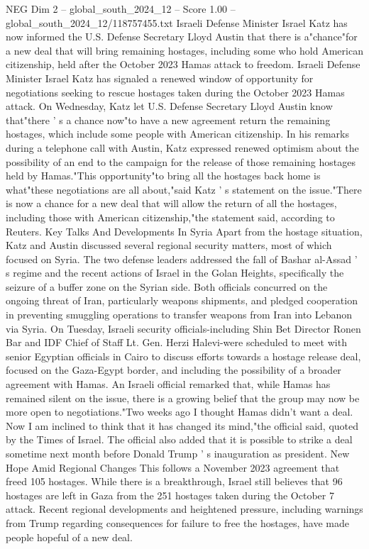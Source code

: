 \begin{textsample}{NEG Dim 2 – global\_south\_2024\_12 – Score 1.00 – global\_south\_2024\_12/118757455.txt}  \label{ex:f2_neg_385}
Israeli Defense Minister Israel Katz has now informed the U.S.
Defense Secretary Lloyd Austin that there is a"chance"for a new deal that will bring remaining hostages, including some who hold American citizenship, held after the October 2023 Hamas attack to freedom.
Israeli Defense Minister Israel Katz has signaled a renewed window of opportunity for negotiations seeking to rescue hostages taken during the October 2023 Hamas attack.
On Wednesday, Katz let U.S.
Defense Secretary Lloyd Austin know that"there ' s a chance now"to have a new agreement return the remaining hostages, which include some people with American citizenship.
In his remarks during a telephone call with Austin, Katz expressed renewed optimism about the possibility of an end to the campaign for the release of those remaining hostages held by Hamas."This opportunity"to bring all the hostages back home is what"these negotiations are all about,"said Katz ' s statement on the issue."There is now a chance for a new deal that will allow the return of all the hostages, including those with American citizenship,"the statement said, according to Reuters.
Key Talks And Developments In Syria Apart from the hostage situation, Katz and Austin discussed several regional security matters, most of which focused on Syria.
The two defense leaders addressed the fall of Bashar al-Assad ' s regime and the recent actions of Israel in the Golan Heights, specifically the seizure of a buffer zone on the Syrian side.
Both officials concurred on the ongoing threat of Iran, particularly weapons shipments, and pledged cooperation in preventing smuggling operations to transfer weapons from Iran into Lebanon via Syria.
On Tuesday, Israeli security officials-including Shin Bet Director Ronen Bar and IDF Chief of Staff Lt.
Gen.
Herzi Halevi-were scheduled to meet with senior Egyptian officials in Cairo to discuss efforts towards a hostage release deal, focused on the Gaza-Egypt border, and including the possibility of a broader agreement with Hamas.
An Israeli official remarked that, while Hamas has remained silent on the issue, there is a growing belief that the group may now be more open to negotiations."Two weeks ago I thought Hamas didn't want a deal.
Now I am inclined to think that it has changed its mind,"the official said, quoted by the Times of Israel.
The official also added that it is possible to strike a deal sometime next month before Donald Trump ' s inauguration as president.
New Hope Amid Regional Changes This follows a November 2023 agreement that freed 105 hostages.
While there is a breakthrough, Israel still believes that 96 hostages are left in Gaza from the 251 hostages taken during the October 7 attack.
Recent regional developments and heightened pressure, including warnings from Trump regarding consequences for failure to free the hostages, have made people hopeful of a new deal.

\end{textsample}
